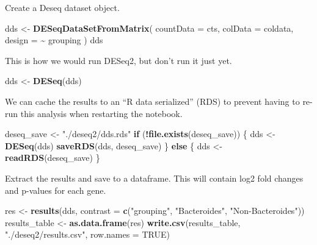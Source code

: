 \documentclass[
]{book}
\newenvironment{Shaded}{\begin{snugshade}}{\end{snugshade}}
\newcommand{\AttributeTok}[1]{\textcolor[rgb]{0.13,0.29,0.53}{#1}}
\newcommand{\ConstantTok}[1]{\textcolor[rgb]{0.56,0.35,0.01}{#1}}
\newcommand{\ControlFlowTok}[1]{\textcolor[rgb]{0.13,0.29,0.53}{\textbf{#1}}}
\newcommand{\FunctionTok}[1]{\textcolor[rgb]{0.13,0.29,0.53}{\textbf{#1}}}
\newcommand{\NormalTok}[1]{#1}
\newcommand{\OtherTok}[1]{\textcolor[rgb]{0.56,0.35,0.01}{#1}}
\newcommand{\SpecialCharTok}[1]{\textcolor[rgb]{0.81,0.36,0.00}{\textbf{#1}}}
\newcommand{\StringTok}[1]{\textcolor[rgb]{0.31,0.60,0.02}{#1}}
\begin{document}
Create a Deseq dataset object.

\begin{Shaded}
\begin{Highlighting}[numbers=left,,]
\NormalTok{dds }\OtherTok{\textless{}{-}} \FunctionTok{DESeqDataSetFromMatrix}\NormalTok{(}
  \AttributeTok{countData =}\NormalTok{ cts,}
  \AttributeTok{colData =}\NormalTok{ coldata,}
  \AttributeTok{design =} \SpecialCharTok{\textasciitilde{}}\NormalTok{ grouping}
\NormalTok{)}
\NormalTok{dds}
\end{Highlighting}
\end{Shaded}

This is how we would run DESeq2, but don't run it just yet.

\begin{Shaded}
\begin{Highlighting}[numbers=left,,]
\NormalTok{dds }\OtherTok{\textless{}{-}} \FunctionTok{DESeq}\NormalTok{(dds)}
\end{Highlighting}
\end{Shaded}

We can cache the results to an ``R data serialized'' (RDS) to prevent having to re-run this analysis when restarting the notebook.

\begin{Shaded}
\begin{Highlighting}[numbers=left,,]
\NormalTok{deseq\_save }\OtherTok{\textless{}{-}} \StringTok{"./deseq2/dds.rds"}
\ControlFlowTok{if}\NormalTok{ (}\SpecialCharTok{!}\FunctionTok{file.exists}\NormalTok{(deseq\_save)) \{}
\NormalTok{  dds }\OtherTok{\textless{}{-}} \FunctionTok{DESeq}\NormalTok{(dds)}
  \FunctionTok{saveRDS}\NormalTok{(dds, deseq\_save)}
\NormalTok{\} }\ControlFlowTok{else}\NormalTok{ \{}
\NormalTok{  dds }\OtherTok{\textless{}{-}} \FunctionTok{readRDS}\NormalTok{(deseq\_save)}
\NormalTok{\}}
\end{Highlighting}
\end{Shaded}

Extract the results and save to a dataframe. This will contain log2 fold changes and p-values for each gene.

\begin{Shaded}
\begin{Highlighting}[numbers=left,,]
\NormalTok{res }\OtherTok{\textless{}{-}} \FunctionTok{results}\NormalTok{(dds, }\AttributeTok{contrast =} \FunctionTok{c}\NormalTok{(}\StringTok{"grouping"}\NormalTok{, }\StringTok{"Bacteroides"}\NormalTok{, }\StringTok{"Non{-}Bacteroides"}\NormalTok{))}
\NormalTok{results\_table }\OtherTok{\textless{}{-}} \FunctionTok{as.data.frame}\NormalTok{(res)}
\FunctionTok{write.csv}\NormalTok{(results\_table, }\StringTok{"./deseq2/results.csv"}\NormalTok{, }\AttributeTok{row.names =} \ConstantTok{TRUE}\NormalTok{)}
\end{Highlighting}
\end{Shaded}
\end{document}
